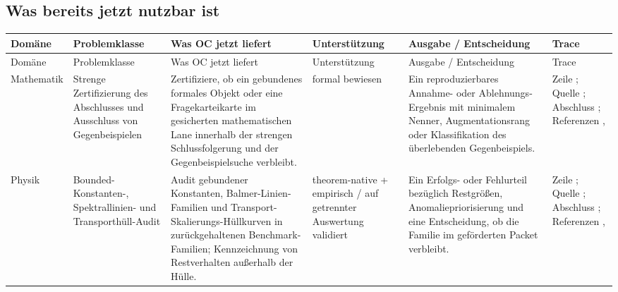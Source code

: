 \subsection{Was bereits jetzt nutzbar ist}
\begingroup
\scriptsize
\setlength{\emergencystretch}{1.5em}
\setlength{\tabcolsep}{2pt}
\setlength{\LTleft}{0pt}
\setlength{\LTright}{0pt}
\begin{longtable}{@{}L{0.11\textwidth}L{0.16\textwidth}L{0.19\textwidth}L{0.12\textwidth}L{0.18\textwidth}L{0.16\textwidth}@{}}
\toprule
Domäne & Problemklasse & Was OC jetzt liefert & Unterstützung & Ausgabe / Entscheidung & Trace \\
\midrule
\endfirsthead
\toprule
Domäne & Problemklasse & Was OC jetzt liefert & Unterstützung & Ausgabe / Entscheidung & Trace \\
\midrule
\endhead
Mathematik & Strenge Zertifizierung des Abschlusses und Ausschluss von Gegenbeispielen & Zertifiziere, ob ein gebundenes formales Objekt oder eine Fragekarteikarte im gesicherten mathematischen Lane innerhalb der strengen Schlussfolgerung und der Gegenbeispielsuche verbleibt. & formal bewiesen & Ein reproduzierbares Annahme- oder Ablehnungs-Ergebnis mit minimalem Nenner, Augmentationsrang oder Klassifikation des überlebenden Gegenbeispiels. & Zeile ; \allowbreak Quelle ; \allowbreak Abschluss ; \allowbreak Referenzen , \allowbreak {} \\
Physik & Bounded-Konstanten-, Spektrallinien- und Transporthüll-\allowbreak Audit & Audit gebundener Konstanten, Balmer-Linien-Familien und Transport-Skalierungs-Hüllkurven in zurückgehaltenen Benchmark-Familien; Kennzeichnung von Restverhalten außerhalb der Hülle. & theorem-native + empirisch / auf getrennter Auswertung validiert & Ein Erfolgs- oder Fehlurteil bezüglich Restgrößen, Anomaliepriorisierung und eine Entscheidung, ob die Familie im geförderten Packet verbleibt. & Zeile ; \allowbreak Quelle ; \allowbreak Abschluss ; \allowbreak Referenzen , \allowbreak {} \\

\end{longtable}
